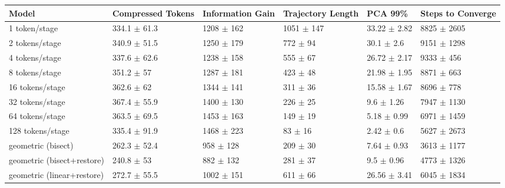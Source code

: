 \begin{tabular}{llllll}
\toprule
 Model                      & Compressed Tokens         & Information Gain        & Trajectory Length       & PCA 99\%                   & Steps to Converge        \\
\midrule
 1 token/stage              & 334.1 {\small $\pm$ 61.3} & 1208 {\small $\pm$ 162} & 1051 {\small $\pm$ 147} & 33.22 {\small $\pm$ 2.82} & 8825 {\small $\pm$ 2605} \\
 2 tokens/stage             & 340.9 {\small $\pm$ 51.5} & 1250 {\small $\pm$ 179} & 772 {\small $\pm$ 94}   & 30.1 {\small $\pm$ 2.6}   & 9151 {\small $\pm$ 1298} \\
 4 tokens/stage             & 337.6 {\small $\pm$ 62.6} & 1238 {\small $\pm$ 158} & 555 {\small $\pm$ 67}   & 26.72 {\small $\pm$ 2.17} & 9333 {\small $\pm$ 456}  \\
 8 tokens/stage             & 351.2 {\small $\pm$ 57}   & 1287 {\small $\pm$ 181} & 423 {\small $\pm$ 48}   & 21.98 {\small $\pm$ 1.95} & 8871 {\small $\pm$ 663}  \\
 16 tokens/stage            & 362.6 {\small $\pm$ 62}   & 1344 {\small $\pm$ 141} & 311 {\small $\pm$ 36}   & 15.58 {\small $\pm$ 1.67} & 8696 {\small $\pm$ 778}  \\
 32 tokens/stage            & 367.4 {\small $\pm$ 55.9} & 1400 {\small $\pm$ 130} & 226 {\small $\pm$ 25}   & 9.6 {\small $\pm$ 1.26}   & 7947 {\small $\pm$ 1130} \\
 64 tokens/stage            & 363.5 {\small $\pm$ 69.5} & 1453 {\small $\pm$ 163} & 149 {\small $\pm$ 19}   & 5.18 {\small $\pm$ 0.99}  & 6971 {\small $\pm$ 1459} \\
 128 tokens/stage           & 335.4 {\small $\pm$ 91.9} & 1468 {\small $\pm$ 223} & 83 {\small $\pm$ 16}    & 2.42 {\small $\pm$ 0.6}   & 5627 {\small $\pm$ 2673} \\
 \midrule
 geometric (bisect)         & 262.3 {\small $\pm$ 52.4} & 958 {\small $\pm$ 128}  & 209 {\small $\pm$ 30}   & 7.64 {\small $\pm$ 0.93}  & 3613 {\small $\pm$ 1177} \\
 geometric (bisect+restore) & 240.8 {\small $\pm$ 53}   & 882 {\small $\pm$ 132}  & 281 {\small $\pm$ 37}   & 9.5 {\small $\pm$ 0.96}   & 4773 {\small $\pm$ 1326} \\
 geometric (linear+restore) & 272.7 {\small $\pm$ 55.5} & 1002 {\small $\pm$ 151} & 611 {\small $\pm$ 66}   & 26.56 {\small $\pm$ 3.41} & 6045 {\small $\pm$ 1834} \\
\bottomrule
\end{tabular}
